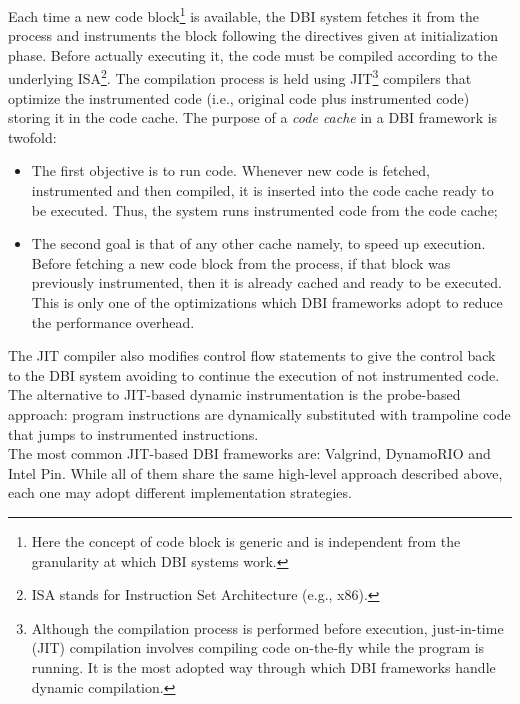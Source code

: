 \documentclass[LaM,binding=0.6cm]{sapthesis}
\begin{document}
Each time a new code block\footnote{Here the concept of code block is generic and is independent from the granularity at which DBI systems work.} is available, the DBI system fetches it from the process and instruments the block following the directives given at initialization phase. Before actually executing it, the code must be compiled according to the underlying ISA\footnote{ISA stands for Instruction Set Architecture (e.g., x$86$).}. The compilation process is held using JIT\footnote{Although the compilation process is performed before execution, just-in-time (JIT) compilation involves compiling code on-the-fly while the program is running. It is the most adopted way through which DBI frameworks handle dynamic compilation.} compilers that optimize the instrumented code (i.e., original code plus instrumented code) storing it in the code cache. The purpose of a \textit{code cache} in a DBI framework is twofold:
\begin{itemize}
\item The first objective is to run code. Whenever new code is fetched, instrumented and then compiled, it is inserted into the code cache ready to be executed. Thus, the system runs instrumented code from the code cache;
\item The second goal is that of any other cache namely, to speed up execution. Before fetching a new code block from the process, if that block was previously instrumented, then it is already cached and ready to be executed. This is only one of the optimizations which DBI frameworks adopt to reduce the performance overhead.
\end{itemize}
The JIT compiler also modifies control flow statements to give the control back to the DBI system avoiding to continue the execution of not instrumented code. The alternative to JIT-based dynamic instrumentation is the probe-based approach: program instructions are dynamically substituted with trampoline code that jumps to instrumented instructions\cite{buck2000api}.\\
The most common JIT-based DBI frameworks are: Valgrind\cite{nethercote2007valgrind}, DynamoRIO\cite{bruening2012transparent} and Intel Pin\cite{luk2005pin}. While all of them share the same high-level approach described above, each one may adopt different implementation strategies.
\end{document}
